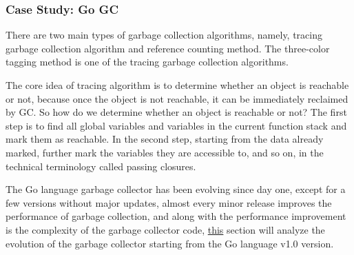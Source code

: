 \documentclass[a4paper]{exam}
\theoremstyle{definition}
\begin{document}
\subsubsection{Case Study: Go GC}
There are two main types of garbage collection algorithms, namely, tracing garbage collection algorithm and reference counting method. The three-color tagging method is one of the tracing garbage collection algorithms.

The core idea of tracing algorithm is to determine whether an object is reachable or not, because once the object is not reachable, it can be immediately reclaimed by GC. So how do we determine whether an object is reachable or not? The first step is to find all global variables and variables in the current function stack and mark them as reachable. In the second step, starting from the data already marked, further mark the variables they are accessible to, and so on, in the technical terminology called passing closures.

The Go language garbage collector has been evolving since day one, except for a few versions without major updates, almost every minor release improves the performance of garbage collection, and along with the performance improvement is the complexity of the garbage collector code, \href{https://draveness.me/golang/docs/part3-runtime/ch07-memory/golang-garbage-collector/}{this} section will analyze the evolution of the garbage collector starting from the Go language v1.0 version.
\end{document}
